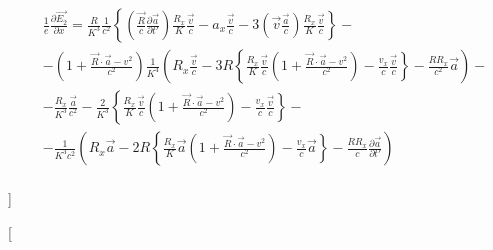 \documentclass[11pt]{article}
\begin{document}
\begin{align}
  & \frac{1}{e}\frac{\partial \overrightarrow{{{E}_{2}}}}{\partial x}=\frac{R}{{{K}^{3}}}\frac{1}{{{c}^{2}}}\left\{ \left( \frac{\overrightarrow{R}}{c}\frac{\partial \overrightarrow{a}}{\partial t'} \right)\frac{{{R}_{x}}}{K}\frac{\overrightarrow{v}}{c}-{{a}_{x}}\frac{\overrightarrow{v}}{c}-3\left( \overrightarrow{v}\frac{\overrightarrow{a}}{c} \right)\frac{{{R}_{x}}}{K}\frac{\overrightarrow{v}}{c} \right\}- \\ 
 & -\left( 1+\frac{\overrightarrow{R}\cdot \overrightarrow{a}-{{v}^{2}}}{{{c}^{2}}} \right)\frac{1}{{{K}^{4}}}\left( {{R}_{x}}\frac{\overrightarrow{v}}{c}-3R\left\{ \frac{{{R}_{x}}}{K}\frac{\overrightarrow{v}}{c}\left( 1+\frac{\overrightarrow{R}\cdot \overrightarrow{a}-{{v}^{2}}}{{{c}^{2}}} \right)-\frac{{{v}_{x}}}{c}\frac{\overrightarrow{v}}{c} \right\}-\frac{R{{R}_{x}}}{{{c}^{2}}}\overrightarrow{a} \right)- \\ 
 & -\frac{{{R}_{x}}}{{{K}^{3}}}\frac{\overrightarrow{a}}{{{c}^{2}}}-\frac{2}{{{K}^{3}}}\left\{ \frac{{{R}_{x}}}{K}\frac{\overrightarrow{v}}{c}\left( 1+\frac{\overrightarrow{R}\cdot \overrightarrow{a}-{{v}^{2}}}{{{c}^{2}}} \right)-\frac{{{v}_{x}}}{c}\frac{\overrightarrow{v}}{c} \right\}- \\ 
 & -\frac{1}{{{K}^{3}}{{c}^{2}}}\left( {{R}_{x}}\overrightarrow{a}-2R\left\{ \frac{{{R}_{x}}}{K}\overrightarrow{a}\left( 1+\frac{\overrightarrow{R}\cdot \overrightarrow{a}-{{v}^{2}}}{{{c}^{2}}} \right)-\frac{{{v}_{x}}}{c}\overrightarrow{a} \right\}-\frac{R{{R}_{x}}}{c}\frac{\partial \overrightarrow{a}}{\partial t'} \right) \\ 
\end{align}

{]}

{[}
\end{document}
